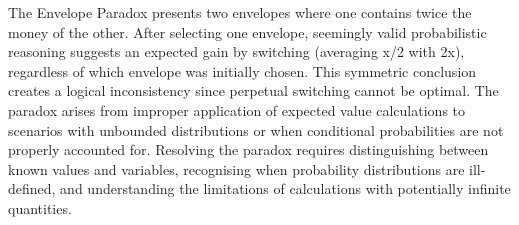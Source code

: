 The Envelope Paradox presents two envelopes where one contains twice the money of the other. After selecting one envelope, seemingly valid probabilistic reasoning suggests an expected gain by switching (averaging x/2 with 2x), regardless of which envelope was initially chosen. This symmetric conclusion creates a logical inconsistency since perpetual switching cannot be optimal. The paradox arises from improper application of expected value calculations to scenarios with unbounded distributions or when conditional probabilities are not properly accounted for. Resolving the paradox requires distinguishing between known values and variables, recognising when probability distributions are ill-defined, and understanding the limitations of calculations with potentially infinite quantities.
